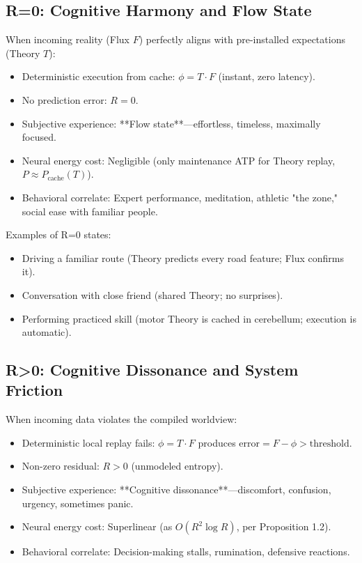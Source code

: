 \documentclass[11pt,oneside]{article}
\theoremstyle{definition}
\begin{document}
\subsection{R=0: Cognitive Harmony and Flow State}

When incoming reality (Flux $F$) perfectly aligns with pre-installed expectations (Theory $T$):

\begin{itemize}
  \item Deterministic execution from cache: $\phi = T \cdot F$ (instant, zero latency).
  \item No prediction error: $R = 0$.
  \item Subjective experience: **Flow state**—effortless, timeless, maximally focused.
  \item Neural energy cost: Negligible (only maintenance ATP for Theory replay, $P \approx P_{\text{cache}}(T)$).
  \item Behavioral correlate: Expert performance, meditation, athletic "the zone," social ease with familiar people.
\end{itemize}

Examples of R=0 states:
\begin{itemize}
  \item Driving a familiar route (Theory predicts every road feature; Flux confirms it).
  \item Conversation with close friend (shared Theory; no surprises).
  \item Performing practiced skill (motor Theory is cached in cerebellum; execution is automatic).
\end{itemize}

\subsection{R>0: Cognitive Dissonance and System Friction}

When incoming data violates the compiled worldview:

\begin{itemize}
  \item Deterministic local replay fails: $\phi = T \cdot F$ produces $\text{error} = F - \phi > \text{threshold}$.
  \item Non-zero residual: $R > 0$ (unmodeled entropy).
  \item Subjective experience: **Cognitive dissonance**—discomfort, confusion, urgency, sometimes panic.
  \item Neural energy cost: Superlinear (as $O(R^2 \log R)$, per Proposition 1.2).
  \item Behavioral correlate: Decision-making stalls, rumination, defensive reactions.
\end{itemize}
\end{document}
